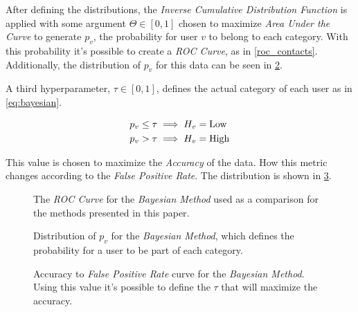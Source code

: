 After defining the distributions, the \emph{Inverse Cumulative Distribution Function} is applied with some argument $\Theta \in \left[ 0, 1 \right]$ chosen to maximize \emph{Area Under the Curve} to generate $p_v$, the probability for user $v$ to belong to each category. With this probability it's possible to create a \emph{ROC Curve}, as in \cref{roc_contacts}. Additionally, the distribution of $p_v$ for this data can be seen in \cref{fig:hist_contacts}.

A third hyperparameter, $\tau \in \left[ 0, 1 \right]$, defines the actual category of each user as in \cref{eq:bayesian}.

\begin{equation}
\label{eq:bayesian}
\begin{aligned}
	p_v \leq \tau &\implies H_v = \operatorname{Low} \\
	p_v > \tau &\implies H_v = \operatorname{High}
\end{aligned}
\end{equation}

This value is chosen to maximize the \emph{Accuracy} of the data. How this metric changes according to the \emph{False Positive Rate}. The distribution is shown in \cref{fig:accuracy_contacts}.

\begin{figure}
\centering
{}
\caption{The \emph{ROC Curve} for the \emph{Bayesian Method} used as a comparison for the methods presented in this paper.}
\label{fig:roc_contacts}
\end{figure}

\begin{figure}
\centering
{}
\caption{Distribution of $p_v$ for the \emph{Bayesian Method}, which defines the probability for a user to be part of each category.}
\label{fig:hist_contacts}
\end{figure}

\begin{figure}
\centering
{}
\caption{Accuracy to \emph{False Positive Rate} curve for the \emph{Bayesian Method}. Using this value it's possible to define the $\tau$ that will maximize the accuracy.}
\label{fig:accuracy_contacts}
\end{figure}

